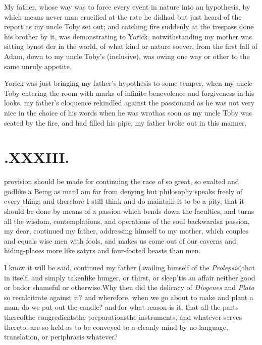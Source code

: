 \documentclass[twoside]{article}
\begin{document}
My father, whose way was to force every event in nature into an
hypothesis, by which means never man crucified 
at the rate he did\tsh had but just heard of the report as
my uncle Toby set out; and catching fire suddenly at
the trespass done his brother by it, was demonstrating to
Yorick, notwithstanding my mother was sitting
by\tsh not\break
{}
der in the world, of what kind or nature soever, from
the first fall of Adam, down to my uncle Toby’s
(inclusive), was owing one way or other to the same unruly
appetite.

Yorick was just bringing my father’s hypothesis to
some temper, when my uncle Toby entering the room with marks
of infinite benevolence and forgiveness in his looks, my
father’s eloquence re\-kindled against the
passion\tsh and as he was not very nice in the choice of
his words when he was wroth\tsh as soon as my uncle
Toby was seated by the fire, and had filled his pipe, my
father broke out in this manner.

\vfill{}\eject

\section{\chapstrut{}.\enspace XXXIII.}

provision should be
made for continuing the race
of so great, so exalted and godlike a
Being as man\tsk I am far from denying\tsk\break
but philosophy speaks freely of every thing; and therefore I still think and do
maintain it to be a pity, that it should be done by means of a
passion which bends down the faculties, and turns all the wisdom,
contemplations, and opera\-tions of the soul backwards\tsh a
passion, my dear, continued my father, addressing himself to my
mother, which couples and equals wise men with fools, and makes us
come out of our caverns and hiding-places more like satyrs and
four-footed beasts than men.\etp{}

I know it will be said, continued my father (availing himself of
the \textit{Prolepsis})\break that in itself, and simply
taken\tsh like hunger, or thirst, or sleep\tsh ’tis an affair
neither good or bad\tsk or shameful or otherwise.\tsh Why then
did the delicacy of \textit{Diogenes} and \textit{Plato} so
recalcitrate against it? and wherefore, when we go about to make
and plant a man, do we put out the candle? and for what reason
is it, that all the parts thereof\tsk the congredients\tsk the
preparations\tsk the instruments, and whatever serves thereto,
are so held as to be conveyed to a cleanly mind by no language,
translation, or periphrasis whatever?
\end{document}
